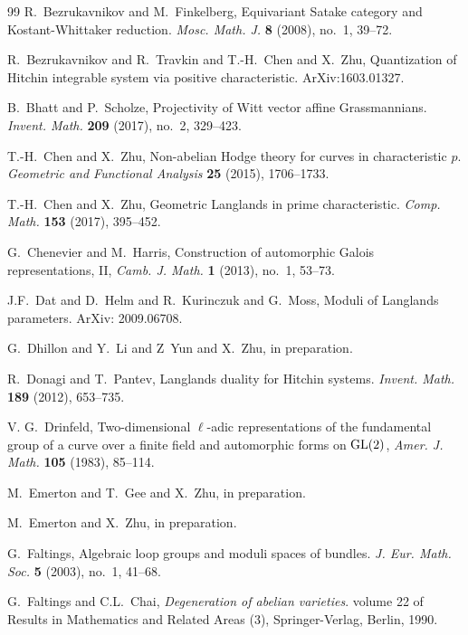 \begin{thebibliography}{99}
R.~Bezrukavnikov and M.~Finkelberg, Equivariant Satake category and Kostant-Whittaker reduction. \emph{Mosc. Math. J.} \textbf{8} (2008), no.~1, 39--72.

R.~Bezrukavnikov and R.~Travkin and T.-H.~Chen and X.~Zhu, Quantization of Hitchin integrable system via positive characteristic. ArXiv:1603.01327.

B.~Bhatt and P.~Scholze, Projectivity of Witt vector affine Grassmannians. \emph{Invent. Math.} \textbf{209} (2017), no.~2, 329--423.

T.-H.~Chen and X.~Zhu, Non-abelian Hodge theory for curves in characteristic $p$. \emph{Geometric and Functional Analysis} \textbf{25} (2015), 1706--1733.

T.-H.~Chen and X.~Zhu, Geometric Langlands in prime characteristic. \emph{Comp. Math.} \textbf{153} (2017), 395--452.

G.~Chenevier and M.~Harris, Construction of automorphic Galois representations, II, \emph{Camb. J. Math.} \textbf{1} (2013), no.~1, 53--73.

J.F.~Dat and D.~Helm and R.~Kurinczuk and G.~Moss, Moduli of Langlands parameters. ArXiv: 2009.06708.

G.~Dhillon and Y.~Li and Z~Yun and X.~Zhu, in preparation.

R.~Donagi and T.~Pantev, Langlands duality for Hitchin systems. \emph{Invent. Math.} \textbf{189} (2012), 653--735.

V. G.~Drinfeld, Two-dimensional $\ell$-adic representations of the fundamental group of a curve over a finite field and automorphic forms on ${\operatorname{GL}}(2)$, \emph{Amer. J. Math.} \textbf{105} (1983), 85--114.

M.~Emerton and T.~Gee and X.~Zhu, in preparation.

M.~Emerton and X.~Zhu, in preparation.

G.~Faltings, Algebraic loop groups and moduli spaces of bundles. \emph{J. Eur. Math. Soc.} \textbf{5} (2003), no.~1, 41--68.

G.~Faltings and C.L.~Chai, \emph{Degeneration of abelian varieties}. volume 22 of Results in Mathematics and Related Areas (3), Springer-Verlag, Berlin, 1990.


\end{thebibliography}
